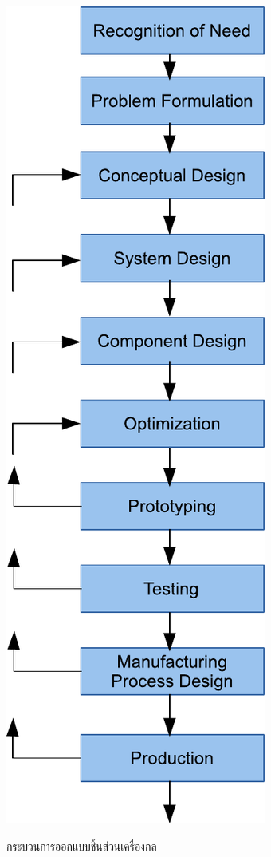 \documentclass[a4paper,openany,nobib]{tufte-book}
\begin{document}
\begin{marginfigure}
  \centering
  \includegraphics[width=\textwidth]{pictures/intro-eng-design/eng-design-process}
\caption{\label{fig: engineering design processes}กระบวนการออกแบบชิ้นส่วนเครื่องกล}
\end{marginfigure}
\end{document}
